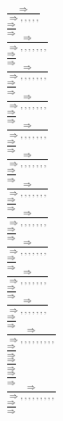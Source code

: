 \documentclass[11pt]{article}
\begin{document}
\begin{center}
\bigskip
\\$\frac{\Rightarrow }{\Rightarrow , , , , , }$
\bigskip
\\$\frac{\Rightarrow }{\Rightarrow }$
\bigskip
\\$\frac{\Rightarrow }{\Rightarrow , , , , , , , }$
\bigskip
\\$\frac{\Rightarrow }{\Rightarrow }$
\bigskip
\\$\frac{\Rightarrow }{\Rightarrow , , , , , , , }$
\bigskip
\\$\frac{\Rightarrow }{\Rightarrow }$
\bigskip
\\$\frac{\Rightarrow }{\Rightarrow , , , , , , , }$
\bigskip
\\$\frac{\Rightarrow }{\Rightarrow }$
\bigskip
\\$\frac{\Rightarrow }{\Rightarrow , , , , , , , }$
\bigskip
\\$\frac{\Rightarrow }{\Rightarrow }$
\bigskip
\\$\frac{\Rightarrow }{\Rightarrow , , , , , , , }$
\bigskip
\\$\frac{\Rightarrow }{\Rightarrow }$
\bigskip
\\$\frac{\Rightarrow }{\Rightarrow , , , , , , , }$
\bigskip
\\$\frac{\Rightarrow }{\Rightarrow }$
\bigskip
\\$\frac{\Rightarrow }{\Rightarrow , , , , , , , }$
\bigskip
\\$\frac{\Rightarrow }{\Rightarrow }$
\bigskip
\\$\frac{\Rightarrow }{\Rightarrow , , , , , , , }$
\bigskip
\\$\frac{\Rightarrow }{\Rightarrow }$
\bigskip
\\$\frac{\Rightarrow }{\Rightarrow , , , , , , , }$
\bigskip
\\$\frac{\Rightarrow }{\Rightarrow }$
\bigskip
\\$\frac{\Rightarrow }{\Rightarrow , , , , , , , }$
\bigskip
\\$\frac{\Rightarrow }{\Rightarrow }$
\bigskip
\\$\frac{\Rightarrow }{\Rightarrow , , , , , , , , , }$
\bigskip
\\$\frac{\Rightarrow }{\Rightarrow }$
\bigskip
\\$\frac{\Rightarrow }{\Rightarrow }$
\bigskip
\\$\frac{\Rightarrow }{\Rightarrow }$
\bigskip
\\$\frac{\Rightarrow }{\Rightarrow , , , , , , , , , }$
\bigskip
\\$\frac{\Rightarrow }{\Rightarrow }$

\end{center}
\end{document}
